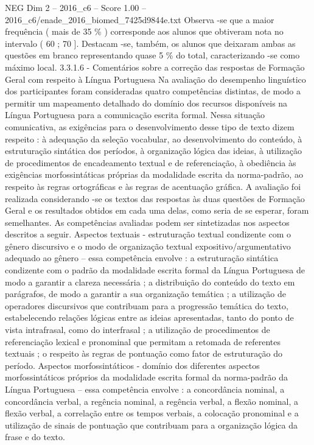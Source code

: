 \begin{textsample}{NEG Dim 2 – 2016\_c6 – Score 1.00 – 2016\_c6/enade\_2016\_biomed\_7425d9844e.txt}
Observa -se que a maior frequência ( mais de 35 \% ) corresponde aos alunos que obtiveram nota no intervalo ( 60 ; 70 ].
Destacam -se, também, os alunos que deixaram ambas as questões em branco representando quase 5 \% do total, caracterizando -se como máximo local. 3.3.1.6 - Comentários sobre a correção das respostas de Formação Geral com respeito à Língua Portuguesa Na avaliação do desempenho linguístico dos participantes foram consideradas quatro competências distintas, de modo a permitir um mapeamento detalhado do domínio dos recursos disponíveis na Língua Portuguesa para a comunicação escrita formal.
Nessa situação comunicativa, as exigências para o desenvolvimento desse tipo de texto dizem respeito : à adequação da seleção vocabular, ao desenvolvimento do conteúdo, à estruturação sintática dos períodos, à organização lógica das ideias, à utilização de procedimentos de encadeamento textual e de referenciação, à obediência às exigências morfossintáticas próprias da modalidade escrita da norma-padrão, ao respeito às regras ortográficas e às regras de acentuação gráfica.
A avaliação foi realizada considerando -se os textos das respostas às duas questões de Formação Geral e os resultados obtidos em cada uma delas, como seria de se esperar, foram semelhantes.
As competências avaliadas podem ser sintetizadas nos aspectos descritos a seguir.
Aspectos textuais - estruturação textual condizente com o gênero discursivo e o modo de organização textual expositivo/argumentativo adequado ao gênero – essa competência envolve : a estruturação sintática condizente com o padrão da modalidade escrita formal da Língua Portuguesa de modo a garantir a clareza necessária ; a distribuição do conteúdo do texto em parágrafos, de modo a garantir a sua organização temática ; a utilização de operadores discursivos que contribuam para a progressão temática do texto, estabelecendo relações lógicas entre as ideias apresentadas, tanto do ponto de vista intrafrasal, como do interfrasal ; a utilização de procedimentos de referenciação lexical e pronominal que permitam a retomada de referentes textuais ; o respeito às regras de pontuação como fator de estruturação do período.
Aspectos morfossintáticos - domínio dos diferentes aspectos morfossintáticos próprios da modalidade escrita formal da norma-padrão da Língua Portuguesa – essa competência envolve : a concordância nominal, a concordância verbal, a regência nominal, a regência verbal, a flexão nominal, a flexão verbal, a correlação entre os tempos verbais, a colocação pronominal e a utilização de sinais de pontuação que contribuam para a organização lógica da frase e do texto.

\end{textsample}
